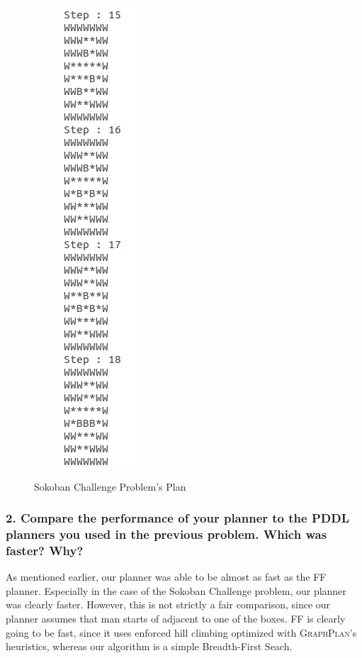 \documentclass[10pt, letter]{article}
\begin{document}
\begin{figure} [h!]
\begin{subfigure}{.5\textwidth}
  \includegraphics[scale = 0.35]{images/sokobanC-ans4}
\end{subfigure}%
\caption{Sokoban Challenge Problem's Plan}
\label{sokoansC}
\end{figure}

\subsubsection*{2. Compare the performance of your planner to the PDDL planners you used in the previous
problem. Which was faster? Why?}
As mentioned earlier, our planner was able to be almost as fast as the FF planner. Especially in the case of the Sokoban Challenge problem, our planner was clearly faster. However, this is not strictly a fair comparison, since our planner assumes that man starts of adjacent to one of the boxes. FF is clearly going to be fast, since it uses enforced hill climbing optimized with \textsc{GraphPlan}'s heuristics, whereas our algorithm is a simple Breadth-First Seach.
\end{document}
